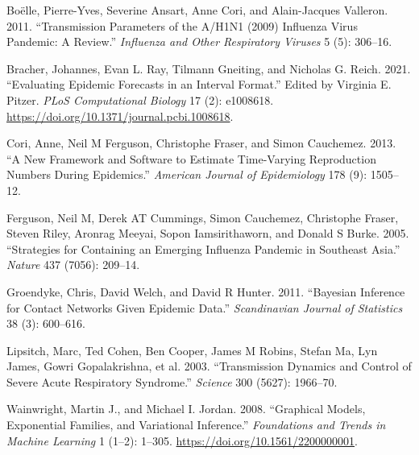 \documentclass[
]{article}
\newlength{\cslhangindent}
\newenvironment{CSLReferences}[2] %
 {\begin{list}{}{%
  \setlength{\itemindent}{0pt}
  \setlength{\leftmargin}{0pt}
  \setlength{\parsep}{0pt}
  \ifodd #1
   \setlength{\leftmargin}{\cslhangindent}
   \setlength{\itemindent}{-1\cslhangindent}
  \fi
  \setlength{\itemsep}{#2\baselineskip}}}
 {\end{list}}
\begin{document}
\label{refs}
\begin{CSLReferences}{1}{0}
Boëlle, Pierre-Yves, Severine Ansart, Anne Cori, and Alain-Jacques Valleron. 2011. {``Transmission Parameters of the {A/H1N1} (2009) Influenza Virus Pandemic: A Review.''} \emph{Influenza and Other Respiratory Viruses} 5 (5): 306--16.

Bracher, Johannes, Evan L. Ray, Tilmann Gneiting, and Nicholas G. Reich. 2021. {``Evaluating Epidemic Forecasts in an Interval Format.''} Edited by Virginia E. Pitzer. \emph{PLoS Computational Biology} 17 (2): e1008618. \url{https://doi.org/10.1371/journal.pcbi.1008618}.

Cori, Anne, Neil M Ferguson, Christophe Fraser, and Simon Cauchemez. 2013. {``A New Framework and Software to Estimate Time-Varying Reproduction Numbers During Epidemics.''} \emph{American Journal of Epidemiology} 178 (9): 1505--12.

Ferguson, Neil M, Derek AT Cummings, Simon Cauchemez, Christophe Fraser, Steven Riley, Aronrag Meeyai, Sopon Iamsirithaworn, and Donald S Burke. 2005. {``Strategies for Containing an Emerging Influenza Pandemic in Southeast Asia.''} \emph{Nature} 437 (7056): 209--14.

Groendyke, Chris, David Welch, and David R Hunter. 2011. {``Bayesian Inference for Contact Networks Given Epidemic Data.''} \emph{Scandinavian Journal of Statistics} 38 (3): 600--616.

Lipsitch, Marc, Ted Cohen, Ben Cooper, James M Robins, Stefan Ma, Lyn James, Gowri Gopalakrishna, et al. 2003. {``Transmission Dynamics and Control of Severe Acute Respiratory Syndrome.''} \emph{Science} 300 (5627): 1966--70.

Wainwright, Martin J., and Michael I. Jordan. 2008. {``Graphical Models, Exponential Families, and Variational Inference.''} \emph{Foundations and Trends in Machine Learning} 1 (1--2): 1--305. \url{https://doi.org/10.1561/2200000001}.

\end{CSLReferences}
\end{document}
